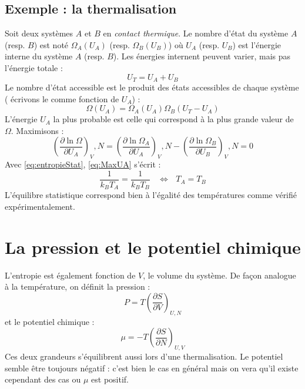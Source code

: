 \documentclass	[11pt, a4paper, openany]{book}
\begin{document}
	\subsection*{Exemple : la thermalisation}
	Soit deux systèmes $A$ et $B$ en \textit{contact thermique}. Le nombre d'état du système
	$A$ (resp. $B$) est noté $\Omega_A(U_A)$ (resp. $\Omega_B(U_B)$) où $U_A$ (resp. $U_B$) est 
	l'énergie interne du système $A$ (resp. $B$). Les énergies internent peuvent varier, mais 
	pas l'énergie totale :
	\begin{equation}
	U_T = U_A+U_B
	\end{equation}
	Le nombre d'état accessible est le produit des états accessibles de chaque système (
	écrivons le comme fonction de $U_A$) :
	\begin{equation}
	\Omega(U_A) = \Omega_A(U_A)\Omega_B(U_T-U_A)
	\end{equation}
	L'énergie $U_A$ la plus probable est celle qui correspond à la plus grande valeur de $
	\Omega$. Maximisons :
	\begin{equation}
	\left(\dfrac{\partial \ln\Omega}{\partial U_A}\right)_V,N =	\left(\dfrac{\partial \ln\Omega_A}
	{\partial U_A}\right)_V,N - 	\left(\dfrac{\partial \ln\Omega_B}{\partial U_B}\right)_V,N = 0
	\label{eq:MaxUA}
	\end{equation}
	Avec \autoref{eq:entropieStat}, \autoref{eq:MaxUA} s'écrit :
	\begin{equation}
	\frac{1}{k_BT_A} = \frac{1}{k_BT_B}\ \ \ \ \Leftrightarrow\ \ \ T_A = T_B
	\end{equation}
	L'équilibre statistique correspond bien à l'égalité des températures comme vérifié
	expérimentalement.
	

\section{La pression et le potentiel chimique}
L'entropie est également fonction de $V$, le volume du système. De façon analogue à la 
température, on définit la pression :
\begin{equation}
P = T\left(\dfrac{\partial S}{\partial V}\right)_{U,N}
\end{equation}
et le potentiel chimique :
\begin{equation}
\mu = -T\left(\dfrac{\partial S}{\partial N}\right)_{U,V}
\end{equation}
Ces deux grandeurs s'équilibrent aussi lors d'une thermalisation. Le potentiel semble être 
toujours négatif : c'est bien le cas en général mais on vera qu'il existe cependant des 
cas ou $\mu$ est positif.
\end{document}
